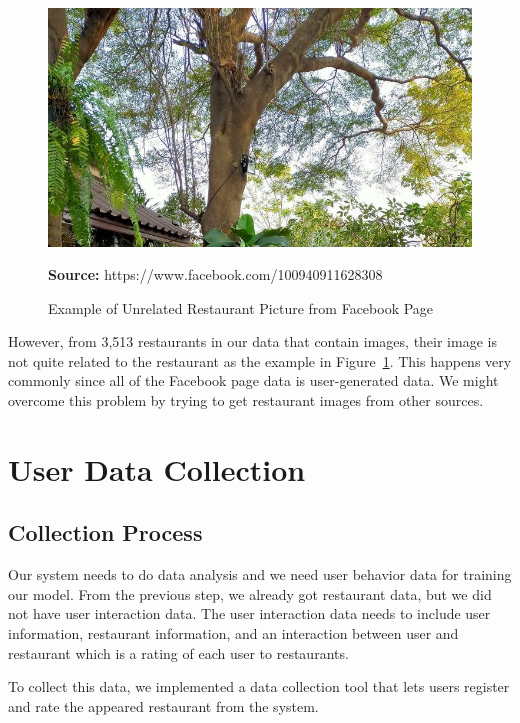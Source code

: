 \documentclass[12pt,oneside,openright,a4paper]{cpe-english-project}
\newcommand*{\captionsource}[2]{%
  \caption[{#1}]{#1}\vspace{-8pt}
  \textbf{Source:} #2}
\begin{document}
\begin{figure}[H]\centering
\includegraphics[width=350pt]{./images/4ExampleofUnrelatedRestaurantPicturefromFacebookPage.jpeg}
\captionsource{Example of Unrelated Restaurant Picture from Facebook Page}{https://www.facebook.com/100940911628308}\label{fig:4ExampleofUnrelatedRestaurantPicturefromFacebookPage}
\end{figure}\vspace{-24pt}
\vspace{1em}

However, from 3,513 restaurants in our data that contain images, their image is not quite related to the restaurant as the example in Figure~\ref{fig:4ExampleofUnrelatedRestaurantPicturefromFacebookPage}. This happens very commonly since all of the Facebook page data is user-generated data. We might overcome this problem by trying to get restaurant images from other sources.


\section{User Data Collection}

\subsection{Collection Process}

Our system needs to do data analysis and we need user behavior data for training our model. From the previous step, we already got restaurant data, but we did not have user interaction data. The user interaction data needs to include user information, restaurant information, and an interaction between user and restaurant which is a rating of each user to restaurants.

To collect this data, we implemented a data collection tool that lets users register and rate the appeared restaurant from the system.
\end{document}
